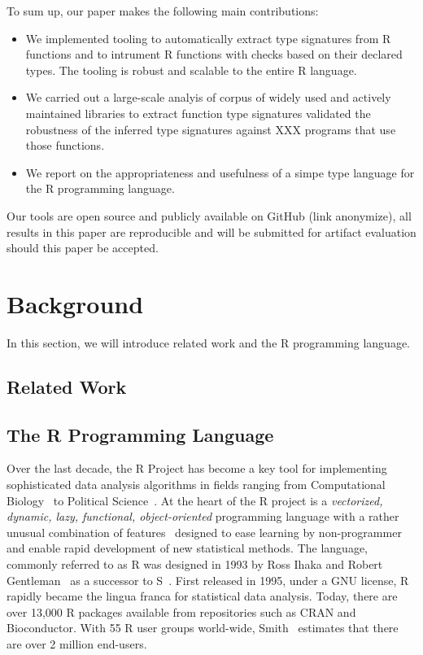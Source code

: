 \documentclass[acmsmall,review,anonymous]{acmart}\settopmatter{printfolios=true,printccs=false,printacmref=false}
\begin{document}
To sum up, our paper makes the following main contributions:
\begin{itemize}
\item We implemented tooling to automatically extract type signatures from R
  functions and to intrument R functions with checks based on their declared
  types. The tooling is robust and scalable to the entire R language.
\item We carried out a large-scale analyis of corpus of \PACKAGES widely
  used and actively maintained libraries to extract function type signatures
  validated the robustness of the inferred type signatures against XXX
  programs that use those functions.
\item We report on the appropriateness and usefulness of a simpe type
  language for the R programming language.
\end{itemize}

Our tools are open source and publicly available on GitHub (link anonymize),
all results in this paper are reproducible and will be submitted for
artifact evaluation should this paper be accepted.
%
\section{Background} %

In this section, we will introduce related work and the R programming language.

\subsection{Related Work}


%
%
\subsection{The R Programming Language}

Over the last decade, the R Project has become a key tool for implementing
sophisticated data analysis algorithms in fields ranging from Computational
Biology~\cite{R05} to Political Science~\cite{R:Keele:2008}. At the heart of
the R project is a \emph{vectorized, dynamic, lazy, functional,
  object-oriented} programming language with a rather unusual combination of
features~\cite{ecoop12} designed to ease learning by non-programmer and
enable rapid development of new statistical methods.  The language, commonly
referred to as R was designed in 1993 by Ross Ihaka and Robert
Gentleman~\cite{R96} as a successor to S~\cite{S88}.  First released in
1995, under a GNU license, R rapidly became the lingua franca for
statistical data analysis. Today, there are over 13,000 R packages available
from repositories such as CRAN and Bioconductor.  With 55 R user groups
world-wide, Smith~\cite{eco11} estimates that there are over 2 million
end-users.
\end{document}
